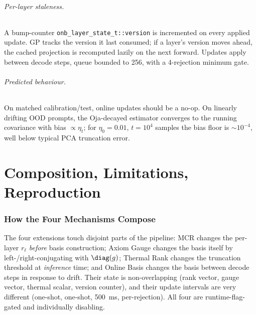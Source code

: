 \documentclass[11pt]{article}
\begin{document}
\paragraph{Per-layer staleness.}  A bump-counter
\texttt{onb\_layer\_state\_t::version} is incremented on every applied
update.  GP tracks the version it last consumed; if a layer's version
moves ahead, the cached projection is recomputed lazily on the next
forward.  Updates apply between decode steps, queue bounded to 256, with a
4-rejection minimum gate.

\paragraph{Predicted behaviour.}  On matched calibration/test, online
updates should be a no-op.  On linearly drifting OOD prompts, the
Oja-decayed estimator converges to the running covariance with bias
$\propto\eta_t$; for $\eta_0{=}0.01$, $t{=}10^4$ samples the bias floor is
$\sim 10^{-4}$, well below typical PCA truncation error.

\part{Composition, Limitations, Reproduction}

\section{How the Four Mechanisms Compose}
\label{sec:compose}
The four extensions touch disjoint parts of the pipeline:
MCR changes the per-layer $r_\ell$ \emph{before} basis construction;
Axiom Gauge changes the basis itself by left-/right-conjugating with
$\diag(g)$; Thermal Rank changes the truncation threshold at \emph{inference}
time; and Online Basis changes the basis between decode steps in response
to drift.  Their state is non-overlapping (rank vector, gauge vector,
thermal scalar, version counter), and their update intervals are very
different (one-shot, one-shot, 500~ms, per-rejection).  All four are
runtime-flag-gated and individually disabling.
\end{document}
